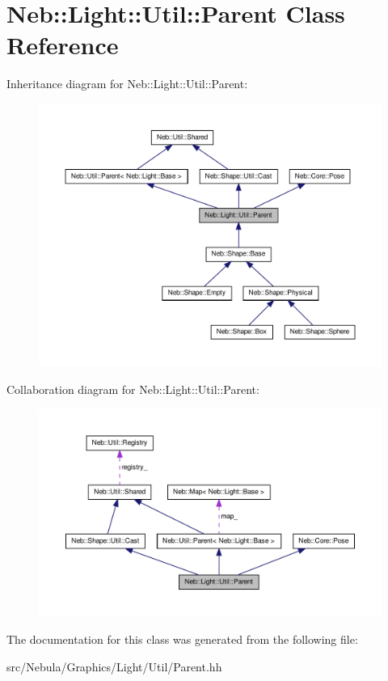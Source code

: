 \hypertarget{classNeb_1_1Light_1_1Util_1_1Parent}{\section{\-Neb\-:\-:\-Light\-:\-:\-Util\-:\-:\-Parent \-Class \-Reference}
\label{classNeb_1_1Light_1_1Util_1_1Parent}
}


\-Inheritance diagram for \-Neb\-:\-:\-Light\-:\-:\-Util\-:\-:\-Parent\-:\nopagebreak
\begin{figure}[H]
\begin{center}
\leavevmode
\includegraphics[width=350pt]{classNeb_1_1Light_1_1Util_1_1Parent__inherit__graph}
\end{center}
\end{figure}


\-Collaboration diagram for \-Neb\-:\-:\-Light\-:\-:\-Util\-:\-:\-Parent\-:\nopagebreak
\begin{figure}[H]
\begin{center}
\leavevmode
\includegraphics[width=350pt]{classNeb_1_1Light_1_1Util_1_1Parent__coll__graph}
\end{center}
\end{figure}


\-The documentation for this class was generated from the following file\-:\begin{DoxyCompactItemize}
\item 
src/\-Nebula/\-Graphics/\-Light/\-Util/\-Parent.\-hh\end{DoxyCompactItemize}
